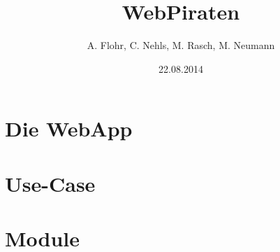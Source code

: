 \documentclass{beamer}
\begin{document}

\title{WebPiraten}  
\author{A. Flohr, C. Nehls, M. Rasch,  M. Neumann}
\date{22.08.2014} 

\begin{frame}
\maketitle
\end{frame} 



\section{Die WebApp}

\section{Use-Case}

\section{Module}




\end{document}
